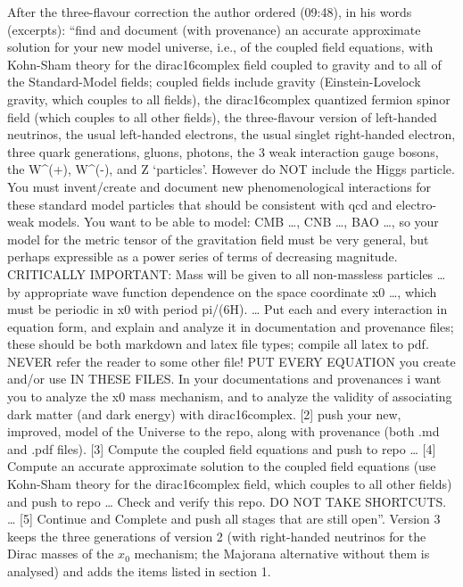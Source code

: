 \documentclass[
  10pt,
]{article}
\begin{document}
After the three-flavour correction the author ordered (09:48), in his
words (excerpts): ``find and document (with provenance) an accurate
approximate solution for your new model universe, i.e., of the coupled
field equations, with Kohn-Sham theory for the dirac16complex field
coupled to gravity and to all of the Standard-Model fields; coupled
fields include gravity (Einstein-Lovelock gravity, which couples to all
fields), the dirac16complex quantized fermion spinor field (which
couples to all other fields), the three-flavour version of left-handed
neutrinos, the usual left-handed electrons, the usual singlet
right-handed electron, three quark generations, gluons, photons, the 3
weak interaction gauge bosons, the W\^{}(+), W\^{}(-), and Z
`particles'. However do NOT include the Higgs particle. You must
invent/create and document new phenomenological interactions for these
standard model particles that should be consistent with qcd and
electro-weak models. You want to be able to model: CMB \ldots, CNB
\ldots, BAO \ldots, so your model for the metric tensor of the
gravitation field must be very general, but perhaps expressible as a
power series of terms of decreasing magnitude. CRITICALLY IMPORTANT:
Mass will be given to all non-massless particles \ldots{} by appropriate
wave function dependence on the space coordinate x0 \ldots, which must
be periodic in x0 with period pi/(6H). \ldots{} Put each and every
interaction in equation form, and explain and analyze it in
documentation and provenance files; these should be both markdown and
latex file types; compile all latex to pdf. NEVER refer the reader to
some other file! PUT EVERY EQUATION you create and/or use IN THESE
FILES. In your documentations and provenances i want you to analyze the
x0 mass mechanism, and to analyze the validity of associating dark
matter (and dark energy) with dirac16complex. {[}2{]} push your new,
improved, model of the Universe to the repo, along with provenance (both
.md and .pdf files). {[}3{]} Compute the coupled field equations and
push to repo \ldots{} {[}4{]} Compute an accurate approximate solution
to the coupled field equations (use Kohn-Sham theory for the
dirac16complex field, which couples to all other fields) and push to
repo \ldots{} Check and verify this repo. DO NOT TAKE SHORTCUTS.
\ldots{} {[}5{]} Continue and Complete and push all stages that are
still open''. Version 3 keeps the three generations of version 2 (with
right-handed neutrinos for the Dirac masses of the \(x_0\) mechanism;
the Majorana alternative without them is analysed) and adds the items
listed in section 1.
\end{document}
